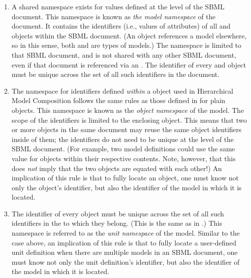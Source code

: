 \begin{enumerate}

\item A shared namespace exists for  values defined at the level of the SBML document.  This namespace is known as \emph{the model namespace} of the document.  It contains the identifiers (i.e., values of  attributes) of all \Model and \ExternalModelDefinition objects within the SBML document.  (An \ExternalModelDefinition object references a model elsewhere, so in this sense, both \Model and \ExternalModelDefinition are types of models.)  The namespace is limited to that SBML document, and is not shared with any other SBML document, even if that document is referenced via an \ExternalModelDefinition.  The identifier of every \Model and \ExternalModelDefinition object must be unique across the set of all such identifiers in the document.

\item The namespace for  identifiers defined \emph{within} a \Model object used in Hierarchical Model Composition follows the same rules as those defined in \sbmlthreecore for plain \Model objects.  This namespace is known as the \emph{object namespace} of the model.  The scope of the identifiers is limited to the enclosing \Model object.  This means that two or more \Model objects in the same document may reuse the same object identifiers inside of them; the identifiers do not need to be unique at the level of the SBML document.  (For example, two model definitions could use the same  value for \Parameter objects within their respective contents.  Note, however, that this does \emph{not} imply that the two objects are equated with each other!)  An implication of this rule is that to fully locate an object, one must know not only the object's identifier, but also the identifier of the model in which it is located.

\item The identifier of every \UnitDefinition object must be unique across the set of all such identifiers in the \Model to which they belong.  (This is the same as in \sbmlthreecore.)  This namespace is referred to as the \emph{unit namespace} of the model.  Similar to the case above, an implication of this rule is that to fully locate a user-defined unit definition when there are multiple models in an SBML document, one must know not only the unit definition's identifier, but also the identifier of the model in which it is located.


\end{enumerate}
